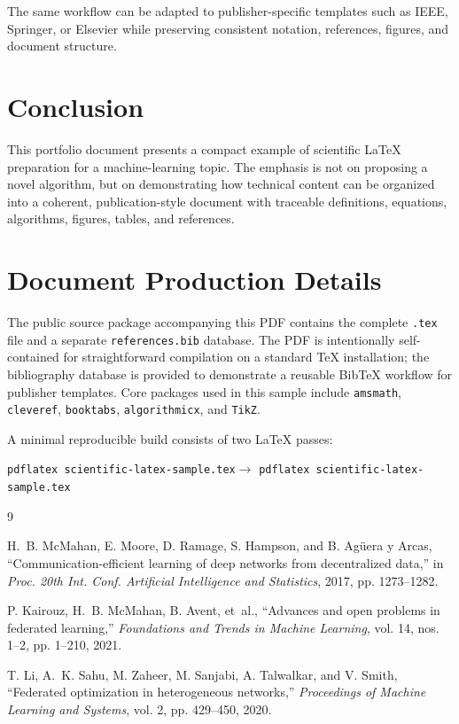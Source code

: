 \documentclass[10pt]{article}
\begin{document}
The same workflow can be adapted to publisher-specific templates such as IEEE, Springer, or Elsevier while preserving consistent notation, references, figures, and document structure.

\section{Conclusion}

This portfolio document presents a compact example of scientific LaTeX preparation for a machine-learning topic. The emphasis is not on proposing a novel algorithm, but on demonstrating how technical content can be organized into a coherent, publication-style document with traceable definitions, equations, algorithms, figures, tables, and references.

\section*{Document Production Details}
The public source package accompanying this PDF contains the complete \texttt{.tex} file and a separate \texttt{references.bib} database. The PDF is intentionally self-contained for straightforward compilation on a standard TeX installation; the bibliography database is provided to demonstrate a reusable BibTeX workflow for publisher templates. Core packages used in this sample include \texttt{amsmath}, \texttt{cleveref}, \texttt{booktabs}, \texttt{algorithmicx}, and \texttt{TikZ}.

A minimal reproducible build consists of two LaTeX passes:
\begin{center}
\small\texttt{pdflatex scientific-latex-sample.tex}\quad $\rightarrow$ \quad
\texttt{pdflatex scientific-latex-sample.tex}
\end{center}

\begin{thebibliography}{9}

H.~B. McMahan, E. Moore, D. Ramage, S. Hampson, and B. Ag\"uera y Arcas,
``Communication-efficient learning of deep networks from decentralized data,''
in \emph{Proc. 20th Int. Conf. Artificial Intelligence and Statistics}, 2017,
pp. 1273--1282.

P. Kairouz, H.~B. McMahan, B. Avent, et~al.,
``Advances and open problems in federated learning,''
\emph{Foundations and Trends in Machine Learning}, vol. 14, nos. 1--2,
pp. 1--210, 2021.

T. Li, A.~K. Sahu, M. Zaheer, M. Sanjabi, A. Talwalkar, and V. Smith,
``Federated optimization in heterogeneous networks,''
\emph{Proceedings of Machine Learning and Systems}, vol. 2,
pp. 429--450, 2020.

\end{thebibliography}
\end{document}
